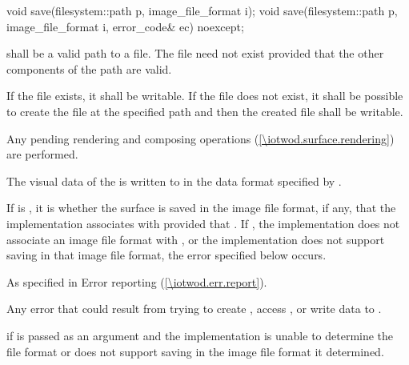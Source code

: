%
\begin{itemdecl}
void save(filesystem::path p, image_file_format i);
void save(filesystem::path p, image_file_format i, error_code& ec) noexcept;
\end{itemdecl}
\begin{itemdescr}
\pnum
\requires
{} shall be a valid path to a file. The file need not exist provided that the other components of the path are valid.

\pnum
If the file exists, it shall be writable. If the file does not exist, it shall be possible to create the file at the specified path and then the created file shall be writable.

\pnum
\effects
Any pending rendering and composing operations (\ref{\iotwod.surface.rendering}) are performed.

\pnum
The visual data of the \underlyingimagesurface is written to  in the data format specified by .

\pnum
If  is , it is  whether the surface is saved in the image file format, if any, that the implementation associates with  provided that . If , the implementation does not associate an image file format with , or the implementation does not support saving in that image file format, the error specified below occurs.

\pnum
\throws
As specified in Error reporting (\ref{\iotwod.err.report}).

\pnum
\errors
Any error that could result from trying to create , access , or write data to .

\pnum
{} if  is passed as an argument and the implementation is unable to determine the file format or does not support saving in the image file format it determined.
\end{itemdescr}

